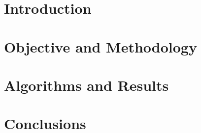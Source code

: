 \documentclass[12pt]{report}
\begin{document}
    
    
    \tableofcontents
    \clearpage
    
    \section*{Introduction}
    

    \section*{Objective and Methodology}
    

    \section*{Algorithms and Results}
    

    \section*{Conclusions}
    

    \newpage

    \begin{minipage}[b]{1\textwidth}
        \listoffigures
    \end{minipage}
    
    \begin{minipage}[b]{1\textwidth}
        \listoftables
    \end{minipage}


    \begin{minipage}[b]{1\textwidth}
        \printbibliography
    \end{minipage}
    
\end{document}

